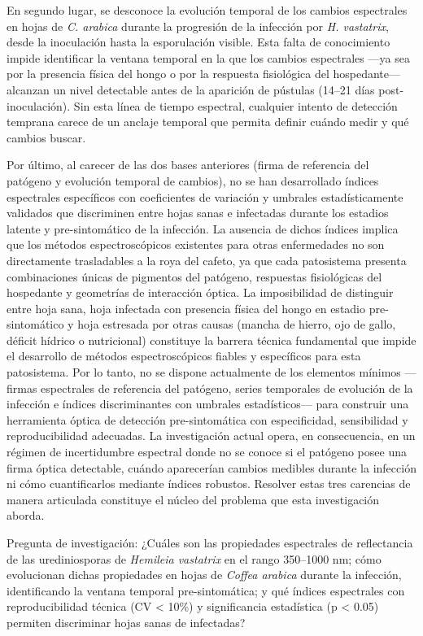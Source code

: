 \documentclass[12pt, a4paper]{article}
\begin{document}
	En segundo lugar, se desconoce la evolución temporal de los cambios espectrales en hojas de \textit{C. arabica} durante la progresión de la infección por \textit{H. vastatrix}, desde la inoculación hasta la esporulación visible. Esta falta de conocimiento impide identificar la ventana temporal en la que los cambios espectrales —ya sea por la presencia física del hongo o por la respuesta fisiológica del hospedante— alcanzan un nivel detectable antes de la aparición de pústulas (14–21 días post-inoculación). Sin esta línea de tiempo espectral, cualquier intento de detección temprana carece de un anclaje temporal que permita definir cuándo medir y qué cambios buscar. 
	
	Por \'ultimo, al carecer de las dos bases anteriores (firma de referencia del patógeno y evolución temporal de cambios), no se han desarrollado índices espectrales específicos con coeficientes de variación y umbrales estadísticamente validados que discriminen entre hojas sanas e infectadas durante los estadios latente y pre-sintomático de la infección. La ausencia de dichos índices implica que los métodos espectroscópicos existentes para otras enfermedades no son directamente trasladables a la roya del cafeto, ya que cada patosistema presenta combinaciones únicas de pigmentos del patógeno, respuestas fisiológicas del hospedante y geometrías de interacción óptica. La imposibilidad de distinguir entre hoja sana, hoja infectada con presencia física del hongo en estadio pre-sintomático y hoja estresada por otras causas (mancha de hierro, ojo de gallo, déficit hídrico o nutricional) constituye la barrera técnica fundamental que impide el desarrollo de métodos espectroscópicos fiables y específicos para esta patosistema. Por lo tanto, no se dispone actualmente de los elementos mínimos —firmas espectrales de referencia del patógeno, series temporales de evolución de la infección e índices discriminantes con umbrales estadísticos— para construir una herramienta óptica de detección pre-sintomática con especificidad, sensibilidad y reproducibilidad adecuadas. La investigación actual opera, en consecuencia, en un régimen de incertidumbre espectral donde no se conoce si el patógeno posee una firma óptica detectable, cuándo aparecerían cambios medibles durante la infección ni cómo cuantificarlos mediante índices robustos. Resolver estas tres carencias de manera articulada constituye el núcleo del problema que esta investigación aborda.
	
	Pregunta de investigación: ¿Cuáles son las propiedades espectrales de reflectancia de las urediniosporas de \textit{Hemileia vastatrix} en el rango 350–1000 nm; cómo evolucionan dichas propiedades en hojas de \textit{Coffea arabica} durante la infección, identificando la ventana temporal pre-sintomática; y qué índices espectrales con reproducibilidad técnica (CV < 10\%) y significancia estadística (p < 0.05) permiten discriminar hojas sanas de infectadas?
	
\end{document}
